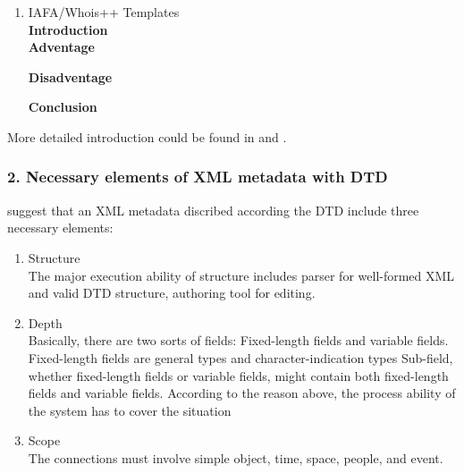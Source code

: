 \documentclass[a4paper]{article} %
\begin{document}
\begin{enumerate}
	\item IAFA/Whois++ Templates\\
	{\bf Introduction}\\
	
	{\bf Adventage}
	\begin{enumerate}
		
	\end{enumerate}	
	{\bf Disadventage}
	\begin{enumerate}
		
	\end{enumerate}
	{\bf Conclusion}\\	
	
\end{enumerate}

More detailed introduction could be found in {\bf\cite{1:1:1}} and {\bf\cite{Rachel:2009:reviewofmetadataformats}}.


\subsubsection*{2. Necessary elements of XML metadata with DTD}
\label{sec:mets}
{\bf\cite{Ruey-Shun:2003:DevelopinganXMLframeworkformetadatasystem}} suggest that an XML metadata discribed according the DTD include three necessary elements:
\begin{enumerate}
	\item Structure\\
	The major execution ability of structure includes parser for well-formed XML and
	valid DTD structure, authoring tool for editing.
	
	\item Depth\\
	Basically, there are two sorts of fields: Fixed-length fields and variable fields.
	Fixed-length fields are general types and character-indication types Sub-field, whether
	fixed-length fields or variable fields, might contain both fixed-length fields and
	variable fields. According to the reason above, the process ability of the system has to
	cover the situation
	
	\item Scope\\
	The connections must involve simple object, time, space, people, and event. 
\end{enumerate}
\end{document}
